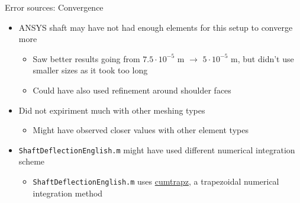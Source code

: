 \documentclass[11pt]{beamer}
\begin{document}
    \begin{frame}{Error sources: Convergence}
        \begin{itemize}
            \item ANSYS shaft may have not had enough elements for this setup to converge more
                \begin{itemize} 
                    \item Saw better results going from $7.5\cdot10^{-5}$ m $\to$ $5\cdot10^{-5}$ m, but didn't use smaller sizes as it took too long
                    \item Could have also used refinement around shoulder faces
                \end{itemize}
            \item Did not expiriment much with other meshing types
                \begin{itemize} 
                    \item Might have observed closer values with other element types
                \end{itemize}
            \item \texttt{ShaftDeflectionEnglish.m} might have used different numerical integration scheme
                \begin{itemize}
                    \item \texttt{ShaftDeflectionEnglish.m} uses \href{https://www.mathworks.com/help/matlab/ref/cumtrapz.html}{cumtrapz}, a trapezoidal numerical integration method
                \end{itemize}
        \end{itemize}
    \end{frame}
\end{document}
